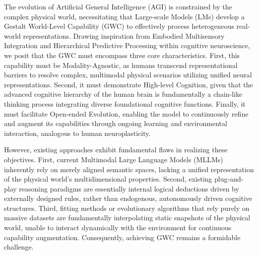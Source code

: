 
The evolution of Artificial General Intelligence (AGI) is constrained by the complex physical world, necessitating that Large-scale Models (LMs) develop a Gestalt World-Level Capability (GWC) to effectively process heterogeneous real-world representations. Drawing inspiration from Embodied Multisensory Integration and Hierarchical Predictive Processing within cognitive neuroscience, we posit that the GWC must encompass three core characteristics. First, this capability must be Modality-Agnostic, as humans transcend representational barriers to resolve complex, multimodal physical scenarios utilizing unified neural representations. Second, it must demonstrate High-level Cognition, given that the advanced cognitive hierarchy of the human brain is fundamentally a chain-like thinking process integrating diverse foundational cognitive functions. Finally, it must facilitate Open-ended Evolution, enabling the model to continuously refine and augment its capabilities through ongoing learning and environmental interaction, analogous to human neuroplasticity.

However, existing approaches exhibit fundamental flaws in realizing these objectives. First, current Multimodal Large Language Models (MLLMs) inherently rely on merely aligned semantic spaces, lacking a unified representation of the physical world’s multidimensional properties. Second, existing plug-and-play reasoning paradigms are essentially internal logical deductions driven by externally designed rules, rather than endogenous, autonomously driven cognitive structures. Third, fitting methods or evolutionary algorithms that rely purely on massive datasets are fundamentally interpolating static snapshots of the physical world, unable to interact dynamically with the environment for continuous capability augmentation. Consequently, achieving GWC remains a formidable challenge.

